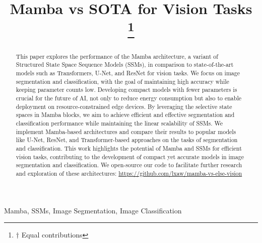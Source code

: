 \documentclass[conference]{IEEEtran}
\begin{document}
\title{Mamba vs SOTA for Vision Tasks\\
    \thanks{$\dagger$ Equal contributions}
}

\author{
    \and
}

\maketitle

\begin{abstract}
    This paper explores the performance of the Mamba architecture, a variant of Structured State Space Sequence Models (SSMs), in comparison to state-of-the-art models such as Transformers, U-Net, and ResNet for vision tasks. We focus on image segmentation and classification, with the goal of maintaining high accuracy while keeping parameter counts low. Developing compact models with fewer parameters is crucial for the future of AI, not only to reduce energy consumption but also to enable deployment on resource-constrained edge devices.
    By leveraging the selective state spaces in Mamba blocks, we aim to achieve efficient and effective segmentation and classification performance while maintaining the linear scalability of SSMs. We implement Mamba-based architectures and compare their results to popular models like U-Net, ResNet, and Transformer-based approaches on the tasks of segmentation and classification.
    This work highlights the potential of Mamba and SSMs for efficient vision tasks, contributing to the development of compact yet accurate models in image segmentation and classification. We open-source our code to facilitate further research and exploration of these architectures: \href{https://github.com/lxaw/mamba-vs-else-vision}{https://github.com/lxaw/mamba-vs-else-vision}
\end{abstract}

\begin{IEEEkeywords}
    Mamba, SSMs, Image Segmentation, Image Classification
\end{IEEEkeywords}
\end{document}
